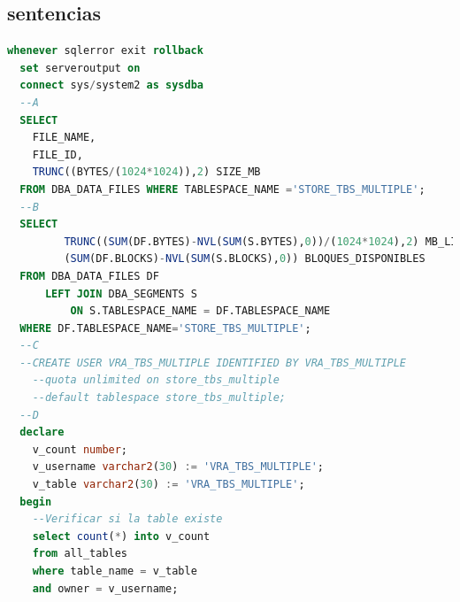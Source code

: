 \documentclass[journal]{IEEEtran}
\begin{document}
\subsection{sentencias}
\begin{lstlisting}[language=sql, caption=s-00-datafile.sql,label={lst:codigo1}]
  whenever sqlerror exit rollback
  set serveroutput on
  connect sys/system2 as sysdba
  --A
  SELECT
    FILE_NAME,
    FILE_ID,
    TRUNC((BYTES/(1024*1024)),2) SIZE_MB
  FROM DBA_DATA_FILES WHERE TABLESPACE_NAME ='STORE_TBS_MULTIPLE';
  --B
  SELECT
         TRUNC((SUM(DF.BYTES)-NVL(SUM(S.BYTES),0))/(1024*1024),2) MB_LIBRES,
         (SUM(DF.BLOCKS)-NVL(SUM(S.BLOCKS),0)) BLOQUES_DISPONIBLES
  FROM DBA_DATA_FILES DF
      LEFT JOIN DBA_SEGMENTS S
          ON S.TABLESPACE_NAME = DF.TABLESPACE_NAME
  WHERE DF.TABLESPACE_NAME='STORE_TBS_MULTIPLE';
  --C
  --CREATE USER VRA_TBS_MULTIPLE IDENTIFIED BY VRA_TBS_MULTIPLE 
    --quota unlimited on store_tbs_multiple 
    --default tablespace store_tbs_multiple;
  --D
  declare
    v_count number;
    v_username varchar2(30) := 'VRA_TBS_MULTIPLE';
    v_table varchar2(30) := 'VRA_TBS_MULTIPLE';
  begin
    --Verificar si la table existe
    select count(*) into v_count
    from all_tables
    where table_name = v_table
    and owner = v_username;
  

\end{lstlisting}
\end{document}
